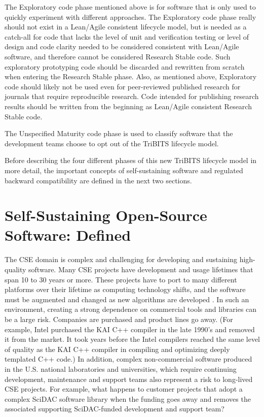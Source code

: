 \documentclass[11pt]{SANDreport}
\begin{document}
The Exploratory code phase mentioned above is for software that is
only used to quickly experiment with different approaches.  
The Exploratory code phase really should not
exist in a Lean/Agile consistent lifecycle model, but is needed as a
catch-all for code that lacks the level of unit and verification
testing or level of design and code clarity needed to be
considered consistent with Lean/Agile software, and therefore cannot be
considered Research Stable code.  Such exploratory prototyping code
should be discarded and rewritten from scratch when entering the
Research Stable phase.  Also, as mentioned above, Exploratory code
should likely not be used even for peer-reviewed published research
for journals that require reproducible research.  Code intended for
publishing research results should be written from the beginning
as Lean/Agile consistent Research Stable code.

The Unspecified Maturity code phase is used to classify software that
the development teams choose to opt out of the TriBITS lifecycle
model.

Before describing the four different phases of this new TriBITS
lifecycle model in more detail, the important concepts of
self-sustaining software and regulated backward compatibility
are defined in the next two sections.


%
{}\section{Self-Sustaining Open-Source Software: Defined}
\label{sec:self_sustaining_open_source_software}
%

The CSE domain is complex and challenging for developing and
sustaining high-quality software.  Many CSE projects have development
and usage lifetimes that span 10 to 30 years or more.  These projects
have to port to many different platforms over their lifetime as
computing technology shifts, and the software must be augmented and
changed as new algorithms are developed
{}\cite{HPCNeedsAToolsStrategy05}.  In such an environment, creating a
strong dependence on commercial tools and libraries can be a large
risk.  Companies are purchased and product lines go away.  (For
example, Intel purchased the KAI C++ compiler in the late 1990's and
removed it from the market. It took years before the Intel compilers
reached the same level of quality as the KAI C++ compiler in compiling
and optimizing deeply templated C++ code.)  In addition, complex
non-commercial software produced in the U.S. national laboratories and
universities, which require continuing development, maintenance and
support teams also represent a risk to long-lived CSE projects.  For
example, what happens to customer projects that adopt a complex SciDAC
software library when the funding goes away and removes the associated
supporting SciDAC-funded development and support team?
\end{document}
